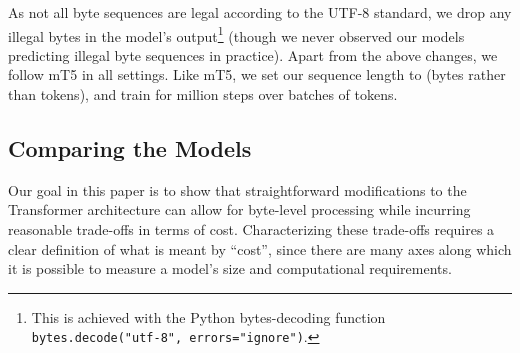 \documentclass[11pt,a4paper]{article}
\begin{document}
As not all byte sequences are legal according to the \mbox{UTF-8} standard, we drop any illegal bytes in the model's output\footnote{This is achieved with the Python bytes-decoding function \texttt{bytes.decode("utf-8", errors="ignore")}.} (though we never observed our models predicting illegal byte sequences in practice). Apart from the above changes, we follow mT5 in all settings. Like mT5, we set our sequence length to  (bytes rather than tokens), and train for  million steps over batches of  tokens.

\subsection{Comparing the Models}

Our goal in this paper is to show that straightforward modifications to the Transformer architecture can allow for byte-level processing while incurring reasonable trade-offs in terms of cost.
Characterizing these trade-offs requires a clear definition of what is meant by ``cost'', since there are many axes along which it is possible to measure a model's size and computational requirements.
\end{document}
